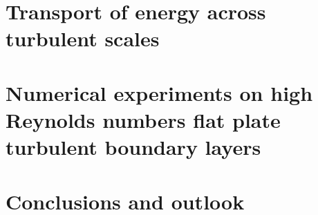 \chapter{Transport of energy across turbulent scales}
%

%
\chapter{Numerical experiments on high Reynolds numbers flat plate turbulent boundary layers}
%

\chapter{Conclusions and outlook}
%







